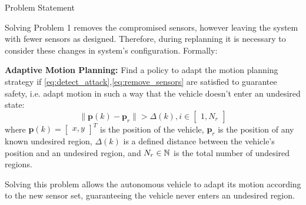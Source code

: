 \begin{section}{Problem Statement}
\begin{problem}
\end{problem}
Solving Problem 1 removes the compromised sensors, however leaving the system with fewer sensors as designed. Therefore, during replanning it is necessary to consider these changes in system's configuration. Formally:
	
\begin{problem} \label{problem2} {\textbf{Adaptive Motion Planning:}}
Find a policy to adapt the motion planning strategy if \eqref{eq:detect_attack},\eqref{eq:remove_sensors} are satisfied to guarantee safety, i.e. adapt motion in such a way that the vehicle doesn't enter an undesired state:
	\begin{equation}
		\lVert {\bm{p}(k)-\bm{p}_r} \rVert >\Delta(k),  i \in \begin{bmatrix} 1,N_r \end{bmatrix}
	\end{equation}
where $\bm{p}(k)={\begin{bmatrix} x,y \end{bmatrix}}^T$ is the position of the vehicle, $\bm{p}_r$ is the position of any known undesired region, $\Delta(k)$ is a defined distance between the vehicle's position and an undesired region, and $N_r \in \mathbb{N}$ is the total number of undesired regions. 
\end{problem}


Solving this problem allows the autonomous vehicle to adapt its motion according to the new sensor set, guaranteeing the vehicle never enters an undesired region.

\end{section}